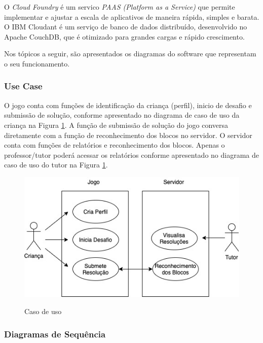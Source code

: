     O \emph{Cloud Foundry} é um servico \textit{PAAS (Platform as a Service)} que permite implementar e ajustar a escala de aplicativos de maneira rápida, simples e barata. O IBM Cloudant é um serviço de banco de dados distribuído, desenvolvido no Apache CouchDB, que é otimizado para grandes cargas e rápido crescimento.
    
    Nos tópicos a seguir, são apresentados os diagramas do software que representam o seu funcionamento.
        
        \subsubsection{Use Case}
        O jogo conta com funções de identificação da criança (perfil), inicio de desafio e submissão de solução, conforme apresentado no diagrama de caso de uso da criança na Figura \ref{figura:use_case}. A função de submissão de solução do jogo conversa diretamente com a função de reconhecimento dos blocos no servidor.
        O servidor conta com funções de relatórios e reconhecimento dos blocos. Apenas o professor/tutor poderá acessar os relatórios conforme apresentado no diagrama de caso de uso do tutor na Figura \ref{figura:use_case}.
        
        \begin{figure}[H]
            \caption{Caso de uso}
            \centering
                \includegraphics[width=15cm]{Imagens/Cap3/Use_Case.jpg}
            \label{figura:use_case}
        \end{figure}
        
        \subsubsection{Diagramas de Sequência}
        
